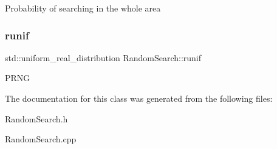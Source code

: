 Probability of searching in the whole area \mbox{\label{class_random_search_ad84bf71f0524d079d3e9f6f84d0a6dd7}} 
\subsubsection{\texorpdfstring{runif}{runif}}
{\footnotesize\ttfamily std\+::uniform\+\_\+real\+\_\+distribution Random\+Search\+::runif\hspace{0.3cm}{\ttfamily [private]}}

P\+R\+NG 

The documentation for this class was generated from the following files\+:\begin{DoxyCompactItemize}
\item 
Random\+Search.\+h\item 
Random\+Search.\+cpp\end{DoxyCompactItemize}
